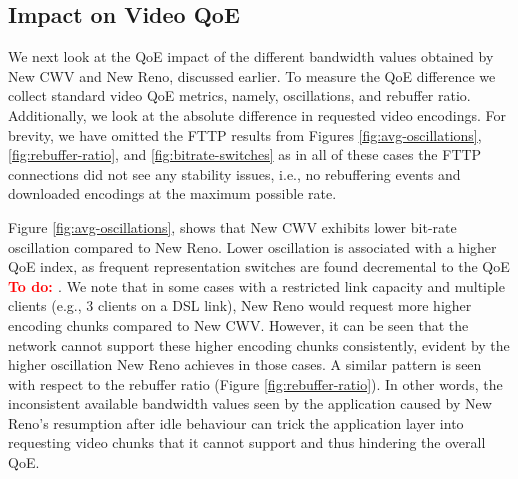 \documentclass[10pt,sigconf]{acmart}
\newcommand{\todo}[1]{\textbf{\textcolor{red}{To do: #1}}}
\begin{document}





\subsection{Impact on Video QoE}

We next look at the QoE impact of the different bandwidth values obtained by New CWV and New Reno, discussed earlier. To measure the QoE difference we collect standard video QoE metrics, namely, oscillations, and rebuffer ratio. Additionally, we look at the absolute difference in requested video encodings. For brevity, we have omitted the FTTP results from Figures \ref{fig:avg-oscillations}, \ref{fig:rebuffer-ratio}, and \ref{fig:bitrate-switches} as in all of these cases the FTTP connections did not see any stability issues, i.e., no rebuffering events and downloaded encodings at the maximum possible rate.

Figure \ref{fig:avg-oscillations}, shows that New CWV exhibits lower bit-rate oscillation compared to New Reno. Lower oscillation is associated with a higher QoE index, as frequent representation switches are found decremental to the QoE \todo{\cite{}}. We note that in some cases with a restricted link capacity and multiple clients (e.g., 3 clients on a DSL link), New Reno would request more higher encoding chunks compared to New CWV. However, it can be seen that the network cannot support these higher encoding chunks consistently, evident by the higher oscillation New Reno achieves in those cases. A similar pattern is seen with respect to the rebuffer ratio (Figure \ref{fig:rebuffer-ratio}). In other words, the inconsistent available bandwidth values seen by the application caused by New Reno's resumption after idle behaviour can trick the application layer into requesting video chunks that it cannot support and thus hindering the overall QoE.
\end{document}
